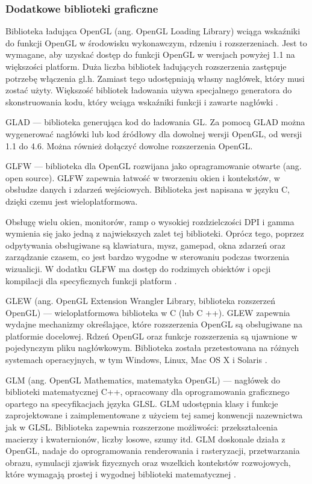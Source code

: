 \subsubsection{Dodatkowe biblioteki graficzne}
Biblioteka ładująca OpenGL (ang. OpenGL Loading Library) wciąga wskaźniki do funkcji OpenGL w środowisku wykonawczym, rdzeniu i rozszerzeniach. Jest to wymagane, aby uzyskać dostęp do funkcji OpenGL w wersjach powyżej 1.1 na większości platform. Duża liczba bibliotek ładujących rozszerzenia zastępuje potrzebę włączenia gl.h. Zamiast tego udostępniają własny nagłówek, który musi zostać użyty. Większość bibliotek ładowania używa specjalnego generatora do skonstruowania kodu, który wciąga wskaźniki funkcji i zawarte nagłówki \cite{LoadingLibrary}. 

GLAD --- biblioteka generująca kod do ładowania GL. Za pomocą GLAD można wygenerować nagłówki lub kod źródłowy dla dowolnej wersji OpenGL, od wersji 1.1 do 4.6. Można również dołączyć dowolne rozszerzenia OpenGL.

GLFW --- biblioteka dla OpenGL rozwijana jako opragramowanie otwarte (ang. open source). GLFW zapewnia łatwość w tworzeniu okien i kontekstów, w obsłudze danych i zdarzeń wejściowych. Biblioteka jest napisana w języku C, dzięki czemu jest wieloplatformowa.  

Obsługę wielu okien, monitorów, ramp o wysokiej rozdzielczości DPI i gamma wymienia się jako jedną z najwiekszych zalet tej biblioteki. Oprócz tego, poprzez odpytywania obsługiwane są klawiatura, mysz, gamepad, okna zdarzeń oraz zarządzanie czasem, co jest bardzo wygodne w sterowaniu podczas tworzenia wizualicji. W dodatku GLFW ma dostęp do rodzimych obiektów i opcji kompilacji dla specyficznych funkcji platform \cite{glfw}.

GLEW (ang. OpenGL Extension Wrangler Library, biblioteka rozszerzeń OpenGL) --- wieloplatformowa biblioteka w C (lub C ++). GLEW zapewnia wydajne mechanizmy określające, które rozszerzenia OpenGL są obsługiwane na platformie docelowej. Rdzeń OpenGL oraz funkcje rozszerzenia są ujawnione w pojedynczym pliku nagłówkowym. Biblioteka została przetestowana na różnych systemach operacyjnych, w tym Windows, Linux, Mac OS X i Solaris \cite{glew}.

GLM (ang. OpenGL Mathematics, matematyka OpenGL) --- nagłówek do biblioteki matematycznej C++, opracowany dla oprogramowania graficznego opartego na specyfikacjach języka GLSL. GLM udostępnia klasy i funkcje zaprojektowane i zaimplementowane z użyciem tej samej konwencji nazewnictwa jak w GLSL. Biblioteka zapewnia rozszerzone możliwości: przekształcenia macierzy i kwaternionów, liczby losowe, szumy itd. GLM doskonale działa z OpenGL, nadaje do oprogramowania renderowania i rasteryzacji, przetwarzania obrazu, symulacji zjawisk fizycznych oraz wszelkich kontekstów rozwojowych, które wymagają prostej i wygodnej biblioteki matematycznej \cite{glm}. 

